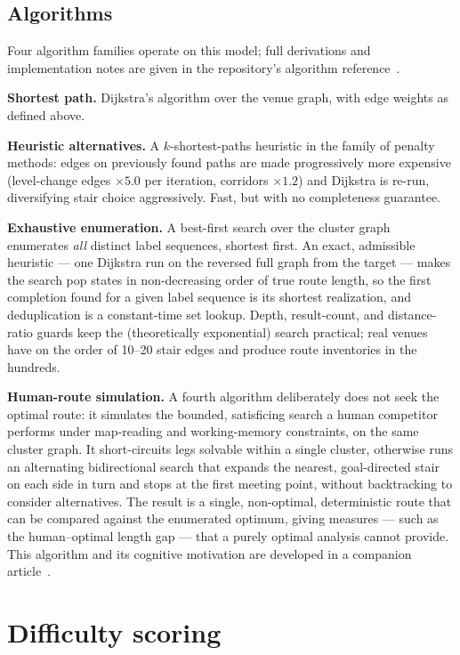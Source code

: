 \documentclass[11pt,a4paper,twocolumn]{article}
\begin{document}
\subsection{Algorithms}

Four algorithm families operate on this model; full derivations and
implementation notes are given in the repository's algorithm
reference~\cite{repo}.

\textbf{Shortest path.} Dijkstra's algorithm over the venue graph, with
edge weights as defined above. 

\textbf{Heuristic alternatives.} A $k$-shortest-paths heuristic in the family
of penalty methods: edges on previously found paths are made progressively
more expensive (level-change edges $\times 5.0$ per iteration, corridors
$\times 1.2$) and Dijkstra is re-run, diversifying stair choice aggressively.
Fast, but with no completeness guarantee.

\textbf{Exhaustive enumeration.} A best-first search over the cluster graph
enumerates \emph{all} distinct label sequences, shortest first. An exact,
admissible heuristic --- one Dijkstra run on the reversed full graph from the
target --- makes the search pop states in non-decreasing order of true route
length, so the first completion found for a given label sequence is its
shortest realization, and deduplication is a constant-time set lookup. Depth,
result-count, and distance-ratio guards keep the (theoretically exponential)
search practical; real venues have on the order of 10--20 stair edges and
produce route inventories in the hundreds.

\textbf{Human-route simulation.} A fourth algorithm deliberately does not
seek the optimal route: it simulates the bounded, satisficing search a human
competitor performs under map-reading and working-memory constraints, on the
same cluster graph. It short-circuits legs solvable within a single cluster,
otherwise runs an alternating bidirectional search that expands the
nearest, goal-directed stair on each side in turn and stops at the first
meeting point, without backtracking to consider alternatives. The result is
a single, non-optimal, deterministic route that can be compared against the
enumerated optimum, giving measures --- such as the human--optimal length gap
--- that a purely optimal analysis cannot provide. This algorithm and its
cognitive motivation are developed in a companion
article~\cite{human-route}.

\section{Difficulty scoring}
\label{sec:scoring}
\end{document}

